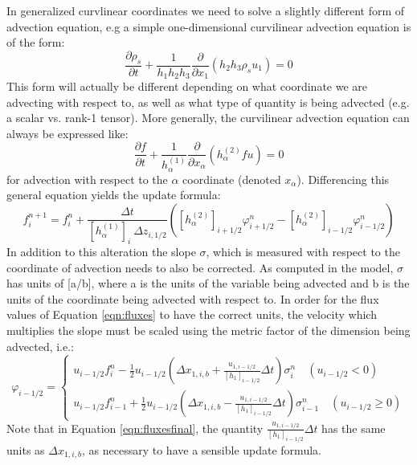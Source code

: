 \documentclass[11pt,letterpaper]{article}
\begin{document}
In generalized curvlinear coordinates we need to solve a slightly different form of advection equation, e.g a simple one-dimensional curvilinear advection equation is of the form:
\begin{equation}
\frac{\partial \rho_s}{\partial t} + \frac{1}{h_1 h_2 h_3} \frac{\partial}{\partial x_1} \left( h_2 h_3 \rho_s u_1 \right)  = 0
\end{equation}
This form will actually be different depending on what coordinate we are advecting with respect to, as well as what type of quantity is being advected (e.g. a scalar vs. rank-1 tensor).  More generally, the curvilinear advection equation can always be expressed like:  
\begin{equation}
\frac{\partial f}{\partial t} + \frac{1}{h_\alpha^{(1)}} \frac{\partial}{\partial x_\alpha} \left( h_\alpha^{(2)} f u \right)  = 0
\end{equation}
for advection with respect to the $\alpha$ coordinate (denoted $x_\alpha$).  Differencing this general equation yields the update formula:
\begin{equation}
f^{n+1}_i = f^n_i + \frac{\Delta t}{ \left[ h_\alpha^{(1)} \right]_i ~ \Delta z_{i,1/2}} \left( \left[ h_\alpha^{(2)} \right]_{i+1/2} \varphi_{i+1/2}^n - \left[ h_\alpha^{(2)} \right]_{i-1/2} \varphi_{i-1/2}^n \right)
\end{equation}
In addition to this alteration the slope $\sigma$, which is measured with respect to the coordinate of advection needs to also be corrected.  As computed in the model, $\sigma$ has units of [a/b], where a is the units of the variable being advected and b is the units of the coordinate being advected with respect to.  In order for the flux values of Equation \ref{eqn:fluxes} to have the correct units, the velocity which multiplies the slope must be scaled using the metric factor of the dimension being advected, i.e.:
\begin{equation}
\varphi_{i-1/2} = \left\{ \begin{array}{c} 
u_{i-1/2} f_{i}^n - \frac{1}{2} u_{i-1/2} \left( \Delta x_{1,i,b} + \frac{u_{1,i-1/2}}{\left[ h_1 \right]_{i-1/2}} \Delta t \right) \sigma_i^n \quad (u_{i-1/2}  < 0) \\
u_{i-1/2} f_{i-1}^n + \frac{1}{2} u_{i-1/2} \left( \Delta x_{1,i,b} - \frac{u_{1,i-1/2}}{\left[ h_1 \right]_{i-1/2}} \Delta t \right) \sigma_{i-1}^n \quad (u_{i-1/2}  \ge 0)
\end{array} \right. \label{eqn:fluxesfinal}
\end{equation} 
Note that in Equation \ref{eqn:fluxesfinal}, the quantity $\frac{u_{1,i-1/2}}{\left[ h_1 \right]_{i-1/2} } \Delta t$ has the same units as $\Delta x_{1,i,b}$, as necessary to have a sensible update formula. 
\end{document}
